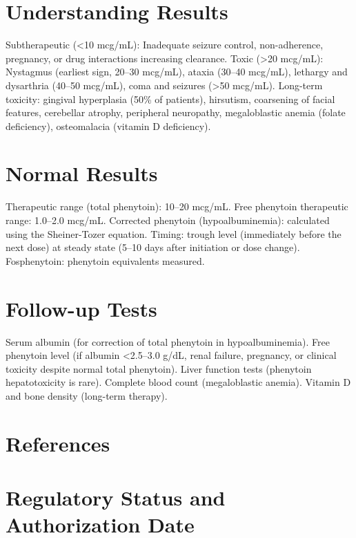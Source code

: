 \section*{Understanding Results}
Subtherapeutic (<10 mcg/mL): Inadequate seizure control, non-adherence, pregnancy, or drug interactions increasing clearance. Toxic (>20 mcg/mL): Nystagmus (earliest sign, 20--30 mcg/mL), ataxia (30--40 mcg/mL), lethargy and dysarthria (40--50 mcg/mL), coma and seizures (>50 mcg/mL). Long-term toxicity: gingival hyperplasia (50\% of patients), hirsutism, coarsening of facial features, cerebellar atrophy, peripheral neuropathy, megaloblastic anemia (folate deficiency), osteomalacia (vitamin D deficiency).

\section*{Normal Results}
Therapeutic range (total phenytoin): 10--20 mcg/mL. Free phenytoin therapeutic range: 1.0--2.0 mcg/mL. Corrected phenytoin (hypoalbuminemia): calculated using the Sheiner-Tozer equation. Timing: trough level (immediately before the next dose) at steady state (5--10 days after initiation or dose change). Fosphenytoin: phenytoin equivalents measured.

\section*{Follow-up Tests}
Serum albumin (for correction of total phenytoin in hypoalbuminemia). Free phenytoin level (if albumin <2.5--3.0 g/dL, renal failure, pregnancy, or clinical toxicity despite normal total phenytoin). Liver function tests (phenytoin hepatotoxicity is rare). Complete blood count (megaloblastic anemia). Vitamin D and bone density (long-term therapy).

\section*{References}



\clearpage
\section*{Regulatory Status and Authorization Date}

\clearpage
